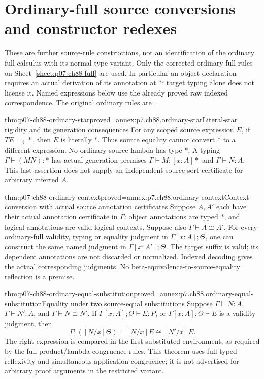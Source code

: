 \section{Ordinary-full source conversions and constructor redexes}
\label{sec:p07-ch88-ordinary-checking}

These are further source-rule constructions, not an identification of the
ordinary full calculus with its normal-type variant. Only the corrected
ordinary full rules on Sheet~\ref{sheet:p07-ch88-full} are used. In
particular an object declaration requires an actual derivation of its
annotation at \(\ast\); target typing alone does not license it.
Named expressions below use the already proved raw indexed correspondence.
The original ordinary rules are \cite[pp.~99--102]{CoquandHuet1988}.

\begin{hblemma}{thm:p07-ch88-ordinary-star}{proved=annex:p7.ch88.ordinary-star}{Literal-star rigidity and its generation consequences}
For any scoped source expression \(E\), if \(TE=_\beta\ast\), then
\(E\) is literally \(\ast\). Thus source equality cannot convert
\(\ast\) to a different expression. No ordinary source lambda has
type \(\ast\). A typing \(\Gamma\vdash(MN):\ast\) has actual
generation premises \(\Gamma\vdash M:[x:A]\ast\) and
\(\Gamma\vdash N:A\). This last assertion does not supply an independent
source sort certificate for arbitrary inferred \(A\).
\end{hblemma}

\begin{hbtheorem}{thm:p07-ch88-ordinary-context}{proved=annex:p7.ch88.ordinary-context}{Context conversion with actual source annotation certificates}
Suppose \(A,A'\) each have their actual annotation certificate in
\(\Gamma\): object annotations are typed \(\ast\), and logical
annotations are valid logical contexts. Suppose also
\(\Gamma\vdash A\cong A'\). For every ordinary-full validity,
typing or equality judgment in \(\Gamma[x:A];\Theta\), one can
construct the same named judgment in \(\Gamma[x:A'];\Theta\).
The target suffix is valid; its dependent annotations are not discarded
or normalized. Indexed decoding gives the actual corresponding judgments.
No beta-equivalence-to-source-equality reflection is a premise.
\end{hbtheorem}

\begin{hbtheorem}{thm:p07-ch88-ordinary-equal-substitution}{proved=annex:p7.ch88.ordinary-equal-substitution}{Equality under two source-equal substitutions}
Suppose \(\Gamma\vdash N:A\), \(\Gamma\vdash N':A\), and
\(\Gamma\vdash N\cong N'\). If
\(\Gamma[x:A];\Theta\vdash E:P\), or
\(\Gamma[x:A];\Theta\vdash E\) is a validity judgment, then
\[
 \Gamma;([N/x]\Theta)\vdash [N/x]E\cong[N'/x]E.
\]
The right expression is compared in the first substituted environment,
as required by the full product/lambda congruence rules. This theorem
uses full typed reflexivity and simultaneous application congruence;
it is not advertised for arbitrary proof arguments in the restricted
variant.
\end{hbtheorem}

